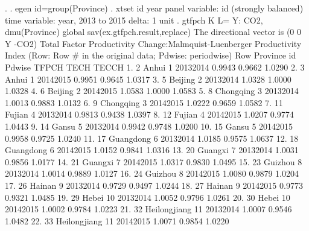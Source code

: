 . 
. egen id=group(Province)
{\smallskip}
. xtset id year
       panel variable:  id (strongly balanced)
        time variable:  year, 2013 to 2015
                delta:  1 unit
{\smallskip}
. gtfpch K L= Y: CO2, dmu(Province) global sav(ex.gtfpch.result,replace)
{\smallskip}
 The directional vector is (0 0 Y -CO2)
{\smallskip}
{\smallskip}
 Total Factor Productivity Change:Malmquist-Luenberger Productivity Index
    (Row: Row \# in the original data; Pdwise: periodwise)
{\smallskip}
     {\TLC}
     {\VBAR} Row       Province   id      Pdwise    TFPCH     TECH    TECCH {\VBAR}
     {\LFTT}
  1. {\VBAR}   2          Anhui    1   2013{\tytilde}2014   0.9943   0.9662   1.0290 {\VBAR}
  2. {\VBAR}   3          Anhui    1   2014{\tytilde}2015   0.9951   0.9645   1.0317 {\VBAR}
  3. {\VBAR}   5        Beijing    2   2013{\tytilde}2014   1.0328   1.0000   1.0328 {\VBAR}
  4. {\VBAR}   6        Beijing    2   2014{\tytilde}2015   1.0583   1.0000   1.0583 {\VBAR}
  5. {\VBAR}   8      Chongqing    3   2013{\tytilde}2014   1.0013   0.9883   1.0132 {\VBAR}
  6. {\VBAR}   9      Chongqing    3   2014{\tytilde}2015   1.0222   0.9659   1.0582 {\VBAR}
  7. {\VBAR}  11         Fujian    4   2013{\tytilde}2014   0.9813   0.9438   1.0397 {\VBAR}
  8. {\VBAR}  12         Fujian    4   2014{\tytilde}2015   1.0207   0.9774   1.0443 {\VBAR}
  9. {\VBAR}  14          Gansu    5   2013{\tytilde}2014   0.9942   0.9748   1.0200 {\VBAR}
 10. {\VBAR}  15          Gansu    5   2014{\tytilde}2015   0.9958   0.9725   1.0240 {\VBAR}
 11. {\VBAR}  17      Guangdong    6   2013{\tytilde}2014   1.0185   0.9575   1.0637 {\VBAR}
 12. {\VBAR}  18      Guangdong    6   2014{\tytilde}2015   1.0152   0.9841   1.0316 {\VBAR}
 13. {\VBAR}  20        Guangxi    7   2013{\tytilde}2014   1.0031   0.9856   1.0177 {\VBAR}
 14. {\VBAR}  21        Guangxi    7   2014{\tytilde}2015   1.0317   0.9830   1.0495 {\VBAR}
 15. {\VBAR}  23        Guizhou    8   2013{\tytilde}2014   1.0014   0.9889   1.0127 {\VBAR}
 16. {\VBAR}  24        Guizhou    8   2014{\tytilde}2015   1.0080   0.9879   1.0204 {\VBAR}
 17. {\VBAR}  26         Hainan    9   2013{\tytilde}2014   0.9729   0.9497   1.0244 {\VBAR}
 18. {\VBAR}  27         Hainan    9   2014{\tytilde}2015   0.9773   0.9321   1.0485 {\VBAR}
 19. {\VBAR}  29          Hebei   10   2013{\tytilde}2014   1.0052   0.9796   1.0261 {\VBAR}
 20. {\VBAR}  30          Hebei   10   2014{\tytilde}2015   1.0002   0.9784   1.0223 {\VBAR}
 21. {\VBAR}  32   Heilongjiang   11   2013{\tytilde}2014   1.0007   0.9546   1.0482 {\VBAR}
 22. {\VBAR}  33   Heilongjiang   11   2014{\tytilde}2015   1.0071   0.9854   1.0220 {\VBAR}
